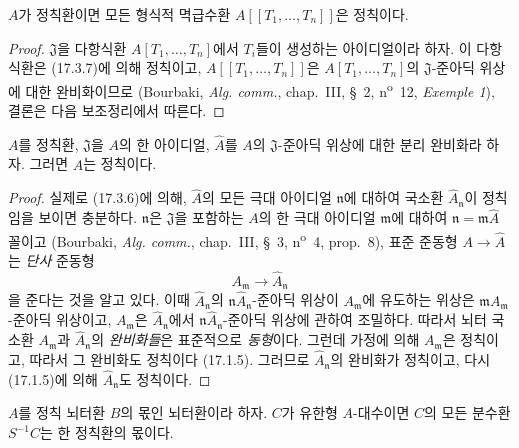\begin{corollary}[17.3.8]
\label{0.17.3.8-fr}
$A$가 정칙환이면 모든 형식적 멱급수환
$A[[T_1,\ldots,T_n]]$은 정칙이다.
\end{corollary}

\begin{proof}
$\mathfrak{J}$을 다항식환 $A[T_1,\ldots,T_n]$에서 $T_i$들이 생성하는
아이디얼이라 하자. 이 다항식환은 (17.3.7)에 의해 정칙이고,
$A[[T_1,\ldots,T_n]]$은 $A[T_1,\ldots,T_n]$의 $\mathfrak{J}$-준아딕
위상에 대한 완비화이므로 (Bourbaki, \emph{Alg. comm.}, chap.~III,
\S~2, n\textsuperscript{o}~12, \emph{Exemple 1}), 결론은 다음
보조정리에서 따른다.
\end{proof}

\begin{lemma}[17.3.8.1]
\label{0.17.3.8.1-fr}
$A$를 정칙환, $\mathfrak{J}$을 $A$의 한 아이디얼,
$\widehat{A}$를 $A$의 $\mathfrak{J}$-준아딕 위상에 대한 분리
완비화라 하자. 그러면 $\widehat{A}$는 정칙이다.
\end{lemma}

\begin{proof}
실제로 (17.3.6)에 의해, $\widehat{A}$의 모든 극대 아이디얼
$\mathfrak{n}$에 대하여 국소환 $\widehat{A}_{\mathfrak{n}}$이 정칙임을
보이면 충분하다.
$\mathfrak{n}$은 $\mathfrak{J}$을 포함하는 $A$의 한
극대 아이디얼 $\mathfrak{m}$에 대하여
$\mathfrak{n}=\mathfrak{m}\widehat{A}$ 꼴이고 (Bourbaki,
\emph{Alg. comm.}, chap.~III, \S~3, n\textsuperscript{o}~4, prop.~8),
표준 준동형 $A\to\widehat{A}$는 \emph{단사} 준동형
\[
  A_{\mathfrak{m}}\longrightarrow\widehat{A}_{\mathfrak{n}}
\]
을 준다는 것을 알고 있다. 이때
$\widehat{A}_{\mathfrak{n}}$의
$\mathfrak{n}\widehat{A}_{\mathfrak{n}}$-준아딕 위상이
$A_{\mathfrak{m}}$에 유도하는 위상은
$\mathfrak{m}A_{\mathfrak{m}}$-준아딕 위상이고,
$A_{\mathfrak{m}}$은 $\widehat{A}_{\mathfrak{n}}$에서
$\mathfrak{n}\widehat{A}_{\mathfrak{n}}$-준아딕 위상에 관하여
조밀하다. 따라서 뇌터 국소환 $A_{\mathfrak{m}}$과
$\widehat{A}_{\mathfrak{n}}$의 \emph{완비화들}은 표준적으로
\emph{동형}이다. 그런데 가정에 의해 $A_{\mathfrak{m}}$은 정칙이고,
따라서 그 완비화도 정칙이다 (17.1.5). 그러므로
$\widehat{A}_{\mathfrak{n}}$의 완비화가 정칙이고, 다시 (17.1.5)에
의해 $\widehat{A}_{\mathfrak{n}}$도 정칙이다.
\end{proof}

\begin{corollary}[17.3.9]
\label{0.17.3.9-fr}
$A$를 정칙 뇌터환 $B$의 몫인 뇌터환이라 하자. $C$가 유한형
$A$-대수이면 $C$의 모든 분수환 $S^{-1}C$는 한 정칙환의 몫이다.
\end{corollary}


